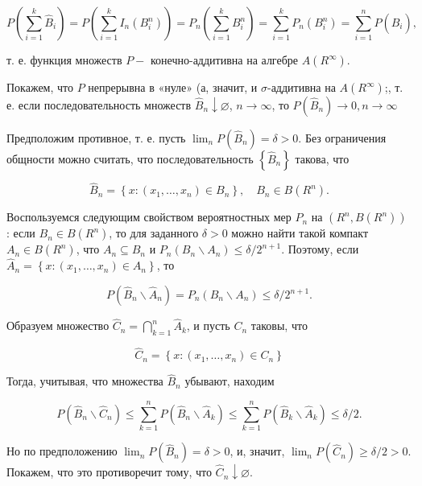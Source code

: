 $$
{P}\left(\sum_{i=1}^{k} \widehat{B}_{i}\right)={P}\left(\sum_{i=1}^{k} {I}_{n}\left(B_{i}^{n}\right)\right)=P_{n}\left(\sum_{i=1}^{k} B_{i}^{n}\right)=\sum_{i=1}^{k} P_{n}\left(B_{i}^{n}\right)=\sum_{i=1}^{n} {P}\left(\widehat{B}_{i}\right),
$$

т. е. функция множеств ${P}-$ конечно-аддитивна на алгебре ${A}\left(R^{\infty}\right)$.

Покажем, что ${P}$ непрерывна в «нуле» (а, значит, и $\sigma$-аддитивна на ${A}\left(R^{\infty}\right)$;, т. е. если последовательность множеств $\widehat{B}_{n} \downarrow \varnothing$, $n \rightarrow \infty$, то ${P}\left(\widehat{B}_{n}\right) \rightarrow 0, n \rightarrow \infty$

Предположим противное, т. е. пусть $\lim _{n} {P}\left(\widehat{B}_{n}\right)=\delta>0$. Без ограничения общности можно считать, что последовательность $\left\{\widehat{B}_{n}\right\}$ такова, что

$$
\widehat{B}_{n}=\left\{x:\left(x_{1}, \ldots, x_{n}\right) \in B_{n}\right\}, \quad B_{n} \in {B}\left(R^{n}\right) .
$$

Воспользуемся следующим свойством вероятностных мер $P_{n}$ на $\left(R^{n}, {B}\left(R^{n}\right)\right)$ : если $B_{n} \in {B}\left(R^{n}\right)$, то для заданного $\delta>0$ можно найти такой компакт $A_{n} \in {B}\left(R^{n}\right)$, что $A_{n} \subseteq B_{n}$ и $P_{n}\left(B_{n} \backslash A_{n}\right) \leqslant \delta / 2^{n+1}$. Поэтому, если $\widehat{A}_{n}=\left\{x:\left(x_{1}, \ldots, x_{n}\right) \in A_{n}\right\}$, то

$$
{P}\left(\widehat{B}_{n} \backslash \widehat{A}_{n}\right)=P_{n}\left(B_{n} \backslash A_{n}\right) \leqslant \delta / 2^{n+1} .
$$

Образуем множество $\widehat{C}_{n}=\bigcap_{k=1}^{n} \widehat{A}_{k}$, и пусть $C_{n}$ таковы, что

$$
\widehat{C}_{n}=\left\{x:\left(x_{1}, \ldots, x_{n}\right) \in C_{n}\right\}
$$

Тогда, учитывая, что множества $\widehat{B}_{n}$ убывают, находим

$$
{P}\left(\widehat{B}_{n} \backslash \widehat{C}_{n}\right) \leqslant \sum_{k=1}^{n} {P}\left(\widehat{B}_{n} \backslash \widehat{A}_{k}\right) \leqslant \sum_{k=1}^{n} {P}\left(\widehat{B}_{k} \backslash \widehat{A}_{k}\right) \leqslant \delta / 2 .
$$

Но по предположению $\lim _{n} {P}\left(\widehat{B}_{n}\right)=\delta>0$, и, значит, $\lim _{n} {P}\left(\widehat{C}_{n}\right) \geqslant \delta / 2>0$. Покажем, что это противоречит тому, что $\widehat{C}_{n} \downarrow \varnothing$.


